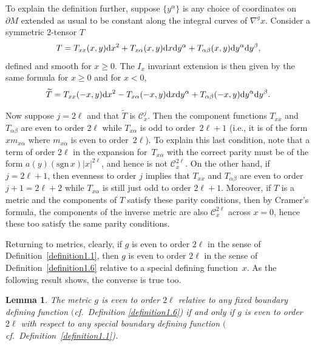 \documentclass[pdftex]{sigma}
\numberwithin{equation}{section}
\newtheorem{Lemma}[Theorem]{Lemma}
\newcommand{\calC}{\mathcal C}
\newcommand{\gbar}{\overline{g}}
\begin{document}
\noindent To explain the definition further, suppose $\{y^{\alpha}\}$ is any choice of coordinates on $\partial M$ extended as usual to be constant along the integral curves of $\nabla^{\gbar} x$. Consider a symmetric $2$-tensor $T$
\[ T= T_{xx}(x,y) {\rm d}x^2+ T_{x\alpha}(x,y) {\rm d}x {\rm d}y^{\alpha} + T_{\alpha \beta}(x,y) {\rm d}y^{\alpha} {\rm d}y^{\beta}, \]
defined and smooth for $x \geq 0$. The $I_x$ invariant extension is then given by the same formula for $x \geq 0$ and for $x < 0$,
\[ \widetilde{T} = T_{xx}(-x,y) {\rm d}x^2 - T_{x\alpha}(-x,y) {\rm d}x {\rm d}y^{\alpha} + T_{\alpha \beta}(-x,y) {\rm d}y^{\alpha} {\rm d}y^{\beta}. \]

Now suppose $j = 2\ell$ and that $\widetilde{T}$ is $\calC^{j}_x$. Then the component functions $T_{xx}$ and $T_{\alpha \beta}$ are even to order $2\ell$ while $T_{x \alpha}$ is odd to order~$2\ell+1$ (i.e., it is of the form $x m_{x\alpha}$ where $m_{x\alpha}$ is even to order~$2\ell$). To explain this last condition,
note that a term of order $2\ell$ in the expansion for~$T_{x\alpha}$ with the correct parity must be of the form
$a(y) (\mathrm{sgn}\, x) |x|^{2\ell}$, and hence is not $\calC^{2\ell}_x$. On the other hand, if $j = 2\ell+1$, then evenness to
order $j$ implies that $T_{xx}$ and $T_{\alpha \beta}$ are even to order $j+1=2\ell+2$ while $T_{x\alpha}$ is still just
odd to order $2\ell+1$. Moreover, if $T$ is a metric and the components of $T$ satisfy these parity conditions, then by Cramer's formula, the
components of the inverse metric are also $\calC^{2\ell}_x$ across $x=0$, hence these too satisfy the same parity conditions.

Returning to metrics, clearly, if $g$ is even to order $2\ell$ in the sense of Definition~\ref{definition1.1}, then $g$ is even to order $2\ell$ in the sense of Definition~\ref{definition1.6} relative to a special defining function~$x$. As the following result shows, the converse is true too.

\begin{Lemma}\label{lemma1.7} The metric $g$ is even to order $2\ell$ relative to any fixed boundary defining function $($cf.\ Definition {\rm \ref{definition1.6})} if and only if $g$ is even to order $2\ell$ with respect to any special boundary defining function $($cf.\ Definition~{\rm \ref{definition1.1})}.
\end{Lemma}
\end{document}
